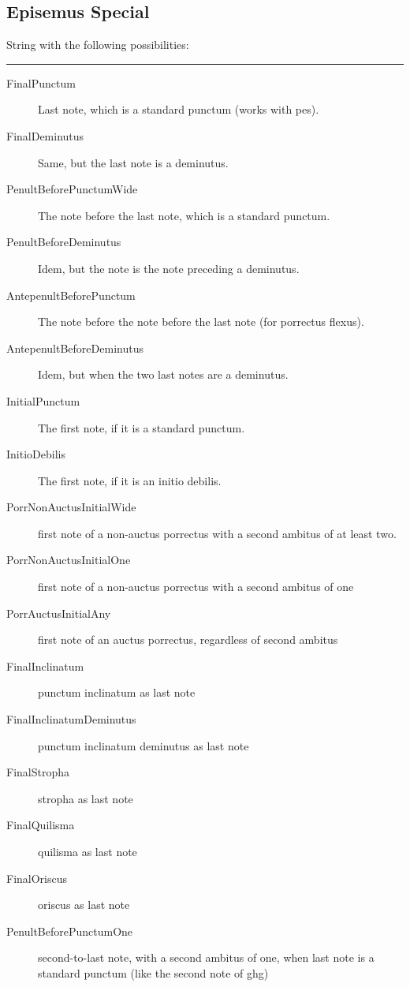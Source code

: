 \subsection{Episemus Special}\label{EpisemusSpecial}
%
\begin{shaded*}%
\vspace{-1.4\baselineskip}
\begin{center}String with the following possibilities:\end{center}
\vspace{-0.8\baselineskip}
\hrule
\vspace{-0.8\baselineskip}
\begin{description}
  \item[FinalPunctum] Last note, which is a standard punctum (works with pes).
  \item[FinalDeminutus] Same, but the last note is a deminutus.
  \item[PenultBeforePunctumWide] The note before the last note, which is a standard punctum.
  \item[PenultBeforeDeminutus] Idem, but the note is the note preceding a deminutus.
  \item[AntepenultBeforePunctum] The note before the note before the last note (for porrectus flexus).
  \item[AntepenultBeforeDeminutus] Idem, but when the two last notes are a deminutus.
  \item[InitialPunctum] The first note, if it is a standard punctum.
  \item[InitioDebilis] The first note, if it is an initio debilis.
  \item[PorrNonAuctusInitialWide] first note of a non-auctus porrectus with a second ambitus of at least two.
  \item[PorrNonAuctusInitialOne] first note of a non-auctus porrectus with a second ambitus of one
  \item[PorrAuctusInitialAny] first note of an auctus porrectus, regardless of second ambitus
  \item[FinalInclinatum] punctum inclinatum as last note
  \item[FinalInclinatumDeminutus] punctum inclinatum deminutus as last note
  \item[FinalStropha] stropha as last note
  \item[FinalQuilisma] quilisma as last note
  \item[FinalOriscus] oriscus as last note
  \item[PenultBeforePunctumOne] second-to-last note, with a second ambitus of one, when last note is a standard punctum (like the second note of ghg)

\end{description}
\end{shaded*}

